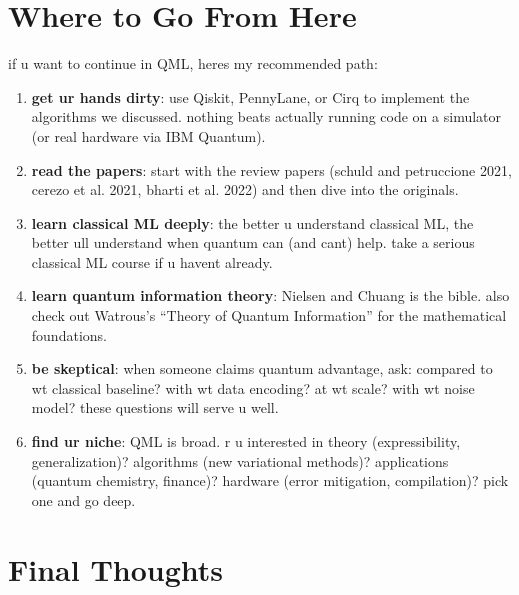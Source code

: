 \documentclass[11pt,a4paper]{article}
\theoremstyle{definition}
\theoremstyle{remark}
\begin{document}
\section{Where to Go From Here}

if u want to continue in QML, heres my recommended path:

\begin{enumerate}[label=\arabic*.]
    \item \textbf{get ur hands dirty}: use Qiskit, PennyLane, or Cirq to implement the algorithms we discussed. nothing beats actually running code on a simulator (or real hardware via IBM Quantum).

    \item \textbf{read the papers}: start with the review papers (schuld and petruccione 2021, cerezo et al. 2021, bharti et al. 2022) and then dive into the originals.

    \item \textbf{learn classical ML deeply}: the better u understand classical ML, the better ull understand when quantum can (and cant) help. take a serious classical ML course if u havent already.

    \item \textbf{learn quantum information theory}: Nielsen and Chuang is the bible. also check out Watrous's ``Theory of Quantum Information'' for the mathematical foundations.

    \item \textbf{be skeptical}: when someone claims quantum advantage, ask: compared to wt classical baseline? with wt data encoding? at wt scale? with wt noise model? these questions will serve u well.

    \item \textbf{find ur niche}: QML is broad. r u interested in theory (expressibility, generalization)? algorithms (new variational methods)? applications (quantum chemistry, finance)? hardware (error mitigation, compilation)? pick one and go deep.
\end{enumerate}

\section{Final Thoughts}
\end{document}
